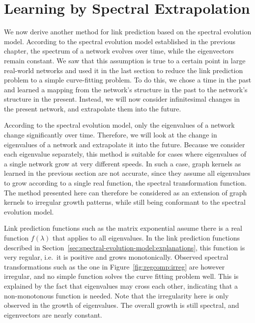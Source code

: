 \documentclass[11pt,a4paper]{book}
\begin{document}
\section{Learning by Spectral Extrapolation}
\label{sec:extrapolation}
We now derive another method for link prediction based on the spectral
evolution model.   
According to the spectral evolution model established in the previous
chapter, the spectrum of a 
network evolves over time, while the eigenvectors remain constant.  We saw
that this assumption is true to a certain point in large real-world
networks and used it in the last section to reduce the link prediction
problem to a simple curve-fitting problem.  To do this, we chose a time
in the past and learned a mapping from the network's structure in the
past to the network's structure in the present.  Instead, we will now
consider infinitesimal changes in the present network, and extrapolate
them into the future.  

According to the spectral evolution model, only the eigenvalues of a
network change
significantly over time.  Therefore, we 
will look at the change in eigenvalues of a network and extrapolate it
into the future.  Because we consider each eigenvalue separately, this
method is suitable for cases where eigenvalues of a single network grow
at very different speeds.  In such a case, graph kernels as learned in
the previous section are not accurate, since they assume all eigenvalues
to grow according to a single real function, the spectral transformation
function. 
The method presented here can therefore be considered as an extension of
graph kernels to irregular growth patterns, while still being conformant
to the spectral evolution model. 

Link prediction functions such as the matrix exponential assume there is a real
function $f(\lambda)$ that applies to all eigenvalues.  In the link prediction
functions described in
Section~\ref{sec:spectral-evolution-model:explanations}, this function
is very regular, i.e.\ it is positive and grows monotonically.  Observed
spectral transformations such as the one in
Figure~\ref{fig:regcomp:irreg}
are however irregular, and
no simple function solves the curve fitting problem well.  This is
explained by the fact that eigenvalues may cross each other, indicating
that a non-monotonous function is needed.  Note that the irregularity here
is only observed in the growth of eigenvalues.  The overall growth is
still spectral, and eigenvectors are nearly constant. 
\end{document}
